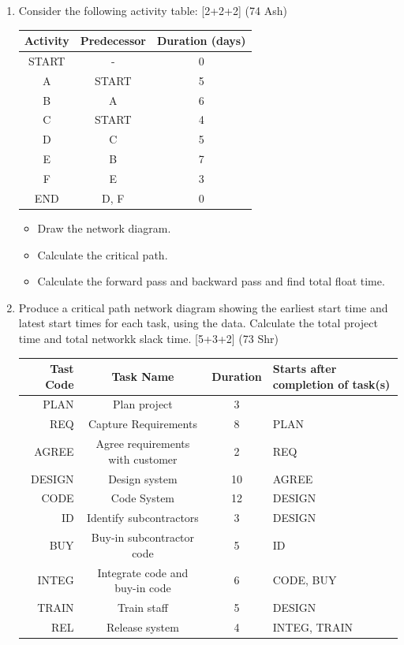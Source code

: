 \documentclass[12pt]{article}
\begin{document}
\begin{enumerate}
      \item Consider the following activity table: \hfill [2+2+2] (74 Ash)\\
        \begin{tabular}{|c|c|c|}
          \hline
          Activity & Predecessor & Duration (days)\\ \hline
          START & - & 0 \\ \hline
          A & START & 5 \\ \hline
          B & A  & 6 \\ \hline
          C & START & 4 \\ \hline
          D & C & 5 \\ \hline
          E & B & 7 \\ \hline
          F & E & 3 \\ \hline
          END & D, F & 0 \\ \hline
        \end{tabular}
        \begin{itemize}[noitemsep]
          \item Draw the network diagram.
          \item Calculate the critical path.
          \item Calculate the forward pass and backward pass and find total float time.
        \end{itemize}

      \item Produce a critical path network diagram showing the earliest start time and latest start times for each task, using the data. Calculate the total project time and total networkk slack time. \hfill [5+3+2] (73 Shr)\\
        \begin{tabular}{|r|c|c|l|}
          \hline
          Tast Code & Task Name & Duration & Starts after completion of task(s)\\ \hline
          PLAN & Plan project & 3 &  \\ \hline
          REQ & Capture Requirements & 8 & PLAN \\ \hline
          AGREE & Agree requirements with customer & 2 & REQ \\ \hline
          DESIGN & Design system & 10 & AGREE \\ \hline
          CODE & Code System & 12 & DESIGN \\ \hline
          ID & Identify subcontractors & 3 & DESIGN  \\ \hline
          BUY & Buy-in subcontractor code & 5 & ID \\ \hline
          INTEG & Integrate code and buy-in code & 6 & CODE, BUY \\ \hline
          TRAIN & Train staff & 5 & DESIGN \\ \hline
          REL & Release system & 4 & INTEG, TRAIN \\ \hline
        \end{tabular}


\end{enumerate}
\end{document}
